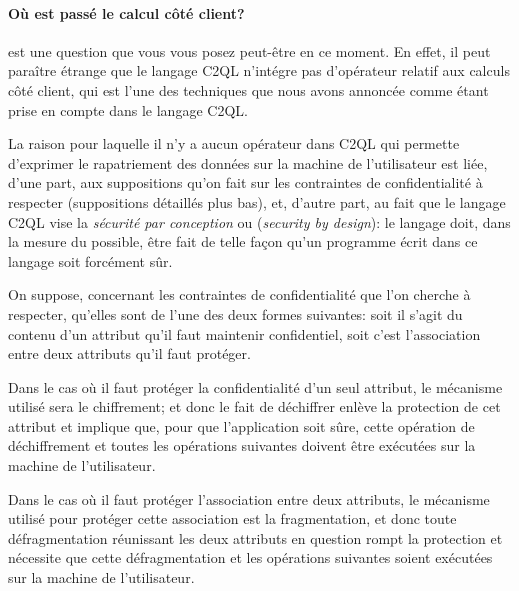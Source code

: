 \paragraph{\og Où est passé le calcul côté client?\fg{}}
est une question que vous vous posez peut-être en ce moment.
En effet, il peut paraître étrange que le langage
C2QL n'intégre pas d'opérateur relatif
aux calculs côté client, qui est l'une des techniques
que nous avons annoncée comme étant prise en compte
dans le langage C2QL.

La raison pour laquelle il n'y a aucun opérateur dans C2QL 
qui permette d'exprimer le rapatriement des données sur la machine de l'utilisateur
est liée, d'une part, aux suppositions qu'on fait sur les contraintes
de confidentialité à respecter
(suppositions détaillés plus bas), et,
d'autre part, au fait que
le langage C2QL vise la \emph{sécurité par 
	conception} ou (\emph{security by design}):
le langage doit, dans la mesure du possible,
 être fait de telle façon
qu'un programme écrit dans ce langage soit forcément
sûr.

On suppose, concernant les contraintes de confidentialité
que l'on cherche à respecter, qu'elles sont de l'une des
deux formes suivantes: soit il s'agit du contenu d'un
attribut qu'il faut maintenir confidentiel,
soit c'est l'association entre deux attributs
qu'il faut protéger.

Dans le cas où il faut protéger la confidentialité
d'un seul attribut, le mécanisme utilisé
sera le chiffrement; et donc le fait
de déchiffrer enlève la protection de cet
attribut et implique que, pour que l'application soit
sûre, cette opération de déchiffrement 
et toutes les opérations suivantes doivent être exécutées
sur la machine de l'utilisateur.

Dans le cas où il faut protéger l'association entre deux 
attributs, le mécanisme utilisé
pour protéger cette association est la fragmentation,
et donc toute défragmentation réunissant les deux attributs
en question rompt la protection et nécessite 
que cette défragmentation et les opérations suivantes
soient exécutées sur la machine de l'utilisateur.


